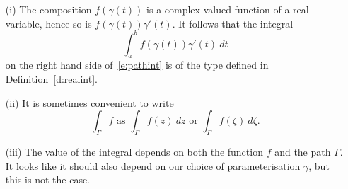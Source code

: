 \begin{note}
\begin{enumerate}
\item[(i)] The composition $f \left( \gamma (t) \right)$ is a complex valued function of a real variable, hence so is $f \left( \gamma (t) \right) \gamma '(t)$.  It follows that the integral
\[
\int_a^b f \left( \gamma(t) \right) \gamma ' (t)\ dt
\]
on the right hand side of~\eqref{e:pathint} is of the type defined in Definition~\ref{d:realint}.
\item[(ii)] It is sometimes convenient to write
\[
\int_{\Gamma} f \text{ as } \int_{\Gamma} f(z)\ dz \text{ or } \int_{\Gamma} f ( \zeta ) \ d \zeta.
\]
\item[(iii)] The value of the integral depends on both the function $f$ and the path $\Gamma$.  It looks like it should also depend on our choice of parameterisation $\gamma$, but this is not the case.
\end{enumerate}
\end{note}


